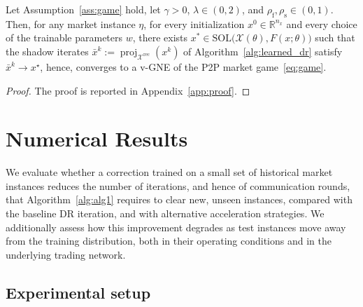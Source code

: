 \documentclass[final]{l4dc2026}
\begin{document}
\begin{theorem}[Convergence]
\label{thm:convergence}
    Let Assumption~\ref{ass:game} hold, let $\gamma>0$, $\lambda\in(0,2)$, and $\rho_{\mathrm f},\rho_{\mathrm s}\in(0,1)$. Then, for any market instance $\eta$, for every initialization $x^0\in\mathbb{R}^{n_x}$ and every choice of the trainable parameters $w$, there exists $x^*\in \mathrm{SOL}\big(\mathcal{X}(\theta),   F(x;\theta)\big)$ such that the shadow iterates $\bar x^k := \operatorname{proj}_{\mathcal{X}^{\mathrm{rec}}}(x^k)$ of Algorithm~\ref{alg:learned_dr} satisfy $\bar x^k \to x^\star$, hence, converges to a v-GNE of the P2P market game~\ref{eq:game}.
\end{theorem}
\begin{proof}
The proof is reported in Appendix~\ref{app:proof}.
\end{proof}


\section{Numerical Results}
\label{sec:numerical}

We evaluate whether a correction trained on a small set of historical market instances reduces the number of iterations, and hence of communication rounds, that Algorithm~\ref{alg:alg1} requires to clear new, unseen instances, compared with the baseline DR iteration, and with alternative acceleration strategies. We additionally assess how this improvement degrades as test instances move away from the training distribution, both in their operating conditions and in the underlying trading network.

\subsection{Experimental setup}
\label{sec:setup}
\end{document}
